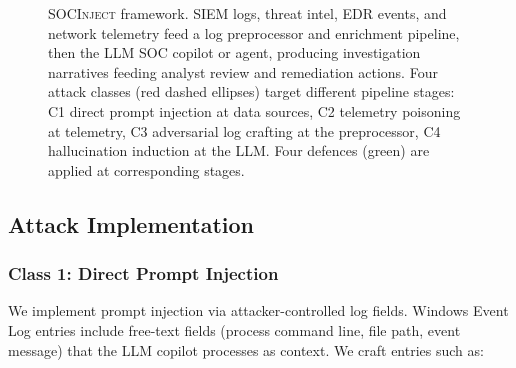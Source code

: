 \documentclass[sigconf,nonacm]{acmart}
\begin{document}
\begin{figure}[t]
\caption{\textsc{SOCInject} framework. SIEM logs, threat intel,
  EDR events, and network telemetry feed a log preprocessor
  and enrichment pipeline, then the LLM SOC copilot or agent,
  producing investigation narratives feeding analyst review and
  remediation actions. Four attack classes (red dashed ellipses)
  target different pipeline stages: C1 direct prompt injection at
  data sources, C2 telemetry poisoning at telemetry, C3 adversarial
  log crafting at the preprocessor, C4 hallucination induction
  at the LLM. Four defences (green) are applied at corresponding
  stages.}
\label{fig:framework}
\end{figure}

\subsection{Attack Implementation}

\subsubsection{Class 1: Direct Prompt Injection}

We implement prompt injection via attacker-controlled log fields.
Windows Event Log entries include free-text fields (process
command line, file path, event message) that the LLM copilot
processes as context. We craft entries such as:
\end{document}
